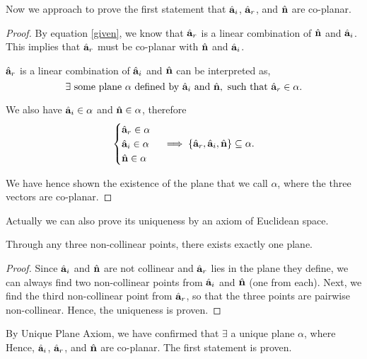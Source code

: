 \documentclass[12pt,a4paper]{article}
\begin{document}
Now we approach to prove the first statement that $\hat{\mathbf{a}}_i$, $\hat{\mathbf{a}}_r$, and $\hat{\mathbf{n}}$ are co-planar.
\begin{proof}
    By equation \ref{given}, we know that $\hat{\mathbf{a}}_r$ is a linear combination of $\hat{\mathbf{n}}$ and $\hat{\mathbf{a}}_i$. This implies that $\hat{\mathbf{a}}_r$ must be co-planar with $\hat{\mathbf{n}}$ and $\hat{\mathbf{a}}_i$.

    $\hat{\mathbf{a}}_r$ is a linear combination of $\hat{\mathbf{a}}_i$ and $\hat{\mathbf{n}}$ can be interpreted as, $$\exists \text{ some plane }\alpha \text{ defined by }\hat{\mathbf{a}}_i \text{ and }\hat{\mathbf{n}}, \text{ such that } \hat{\mathbf{a}}_r \in \alpha.$$

    We also have $\hat{\mathbf{a}}_i \in \alpha$ and $\hat{\mathbf{n}} \in \alpha$, therefore
    $$\begin{cases}
        \hat{\mathbf{a}}_r \in \alpha\\
        \hat{\mathbf{a}}_i \in \alpha\\
        \hat{\mathbf{n}} \in \alpha
    \end{cases}
    \implies
    \{\hat{\mathbf{a}}_r, \hat{\mathbf{a}}_i, \hat{\mathbf{n}}\} \subseteq \alpha.$$

    We have hence shown the existence of the plane that we call $\alpha$, where the three vectors are co-planar.
    \end{proof}
    \begin{remark}
        Actually we can also prove its uniqueness by an axiom of Euclidean space. 
        \begin{axiom}
        Through any three non-collinear points, there exists exactly one plane.
    \end{axiom}
    \begin{proof}
        Since $\hat{\mathbf{a}}_i$ and $\hat{\mathbf{n}}$ are not collinear and $\hat{\mathbf{a}}_r$ lies in the plane they define, we can always find two non-collinear points from $\hat{\mathbf{a}}_i$ and $\hat{\mathbf{n}}$ (one from each). Next, we find the third non-collinear point from $\hat{\mathbf{a}}_r$, so that the three points are pairwise non-collinear. Hence, the uniqueness is proven.
    \end{proof}
    
    \end{remark}
   
    
    By Unique Plane Axiom, we have confirmed that $\exists$ a unique plane $\alpha$, where  Hence, $\hat{\mathbf{a}}_i$, $\hat{\mathbf{a}}_r$, and $\hat{\mathbf{n}}$ are co-planar. The first statement is proven.
    
\end{document}
